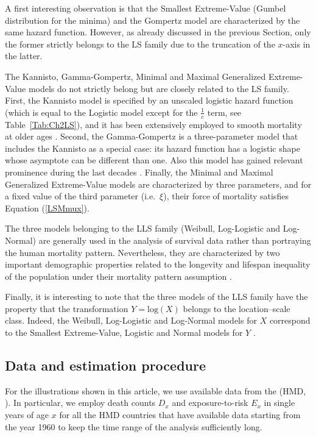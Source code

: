 \documentclass[Thesis]{subfiles}
\begin{document}
A first interesting observation is that the Smallest Extreme-Value (Gumbel distribution for the minima) and the Gompertz model are characterized by the same hazard function. However, as already discussed in the previous Section, only the former strictly belongs to the LS family due to the truncation of the $x$-axis in the latter.

The Kannisto, Gamma-Gompertz, Minimal and Maximal Generalized Extreme-Value models do not strictly belong but are closely related to the LS family. First, the Kannisto model is specified by an unscaled logistic hazard function (which is equal to the Logistic model except for the $\frac{1}{c}$ term, see Table~\ref{Tab:Ch2LS}), and it has been extensively employed to smooth mortality at older ages \cite[for example,][]{Wilmoth2007,sevcikova2016agespecific}. Second, the Gamma-Gompertz is a three-parameter model that includes the Kannisto as a special case: its hazard function has a logistic shape whose asymptote can be different than one. Also this model has gained relevant prominence during the last decades \citep{vaupel1979impact,colchero2016emergence,missov2013gompertz}. Finally, the Minimal and Maximal Generalized Extreme-Value models are characterized by three parameters, and for a fixed value of the third parameter (i.e.~$\xi$), their force of mortality satisfies Equation (\ref{LSMmux}).

The three models belonging to the LLS family (Weibull, Log-Logistic and Log-Normal) are generally used in the analysis of survival data rather than portraying the human mortality pattern. Nevertheless, they are characterized by two important demographic properties related to the longevity and lifespan inequality of the population under their mortality pattern assumption \citep[for additional details, see][]{gigliarano2017longevity}. 

Finally, it is interesting to note that the three models of the LLS family have the property that the transformation $Y=\mathrm{log}(X)$ belongs to the location--scale class. Indeed, the Weibull, Log-Logistic and Log-Normal models for $X$ correspond to the  Smallest Extreme-Value, Logistic and Normal models for $Y$ \citep{lawless2011statistical}.

\subsection{Data and estimation procedure}\label{Subsec:Ch2subsec2.5}

For the illustrations shown in this article, we use available data from the \citeauthor{HMD} (HMD, \citeyear{HMD}). In particular, we employ death counts $D_x$ and exposure-to-risk $E_x$ in single years of age $x$ for all the HMD countries that have available data starting from the year 1960 to keep the time range of the analysis sufficiently long. 
\end{document}
